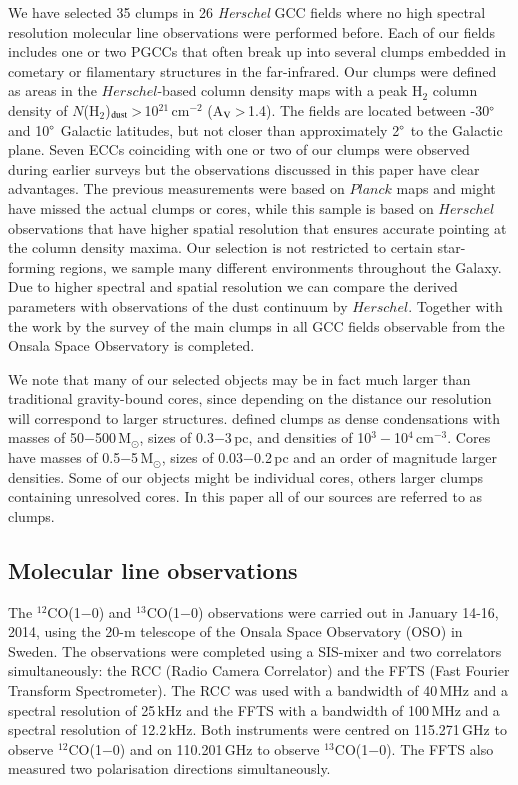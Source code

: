 \documentclass[printer]{aa}
\begin{document}
We have selected 35 clumps in 26 \textit{Herschel} GCC fields where no high spectral resolution molecular line observations were performed before. Each of our fields includes one or two PGCCs that often break up into several clumps embedded in cometary or filamentary structures in the far-infrared. Our clumps were defined as areas in the $Herschel$-based column density maps with a peak H$_2$ column density of $N$(H$_2$)$_{\rm dust}$\,>\,10$^{21}$\,cm$^{-2}$ (A$_{\rm V}$\,>\,1.4). The fields are located between -30$\degree$ and 10$\degree$ Galactic latitudes, but not closer than approximately 2$\degree$ to the Galactic plane. Seven ECCs coinciding with one or two of our clumps were observed during earlier surveys \citep{wu2012,zhang2016} but the observations discussed in this paper have clear advantages. The previous measurements were based on $Planck$ maps and might have missed the actual clumps or cores, while this sample is based on $Herschel$ observations that have higher spatial resolution that ensures accurate pointing at the column density maxima. Our selection is not restricted to certain star-forming regions, we sample many different environments throughout the Galaxy. Due to higher spectral and spatial resolution we can compare the derived parameters with observations of the dust continuum by $Herschel$. Together with the work by \citet{parikka2015} the survey of the main clumps in all GCC fields observable from the Onsala Space Observatory is completed.

We note that many of our selected objects may be in fact much larger than traditional gravity-bound cores, since depending on the distance our resolution will correspond to larger structures. \citet{bergin2007} defined clumps as dense condensations with masses of 50$-$500\,M$_{\odot}$, sizes of 0.3$-$3\,pc, and densities of 10$^3-$10$^4$\,cm$^{-3}$. Cores have masses of 0.5$-$5\,M$_{\odot}$, sizes of 0.03$-$0.2\,pc and an order of magnitude larger densities. Some of our objects might be individual cores, others larger clumps containing unresolved cores. In this paper all of our sources are referred to as clumps.

\subsection{Molecular line observations}
\label{codata}

The $^{12}$CO(1$-$0) and $^{13}$CO(1$-$0) observations were carried out in January 14-16, 2014, using the 20-m telescope of the Onsala Space Observatory (OSO) in Sweden. The observations were completed using a SIS-mixer and two correlators simultaneously: the RCC (Radio Camera Correlator) and the FFTS (Fast Fourier Transform Spectrometer). The RCC was used with a bandwidth of 40\,MHz and a spectral resolution of 25\,kHz and the FFTS with a bandwidth of 100\,MHz and a spectral resolution of 12.2\,kHz. Both instruments were centred on 115.271\,GHz to observe $^{12}$CO(1$-$0) and on 110.201\,GHz to observe $^{13}$CO(1$-$0). The FFTS also measured two polarisation directions simultaneously.
\end{document}
